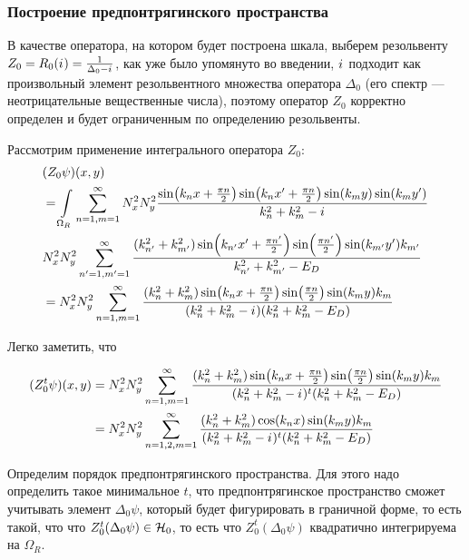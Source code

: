 \subsubsection{Построение предпонтрягинского пространства}
В качестве оператора, на котором будет построена шкала, выберем резольвенту $Z_0 = R_0({i\mkern1mu}) = \frac{1}{\Delta_0 - {i\mkern1mu}}$, как уже было упомянуто во введении, ${i\mkern1mu}$ подходит как произвольный элемент резольвентного множества оператора $\Delta_0$ (его спектр — неотрицательные вещественные числа), поэтому оператор $Z_0$ корректно определен и будет ограниченным по определению резольвенты.

Рассмотрим применение интегрального оператора $Z_0$:
\begin{align*}
& (Z_0 \psi)(x, y) \\
&= \int\limits_{\Omega_R} \sum\limits_{n = 1, m = 1}^\infty N_x^2 N_y^2 \frac{\sin(k_n x + \frac{\pi n}{2}) \sin(k_n x' + \frac{\pi n}{2}) \sin(k_m y) \sin(k_m y')}{k^2_n + k^2_m - {i\mkern1mu}} \\
& N_x^2 N_y^2 \sum\limits_{n' = 1, m' = 1}^\infty \frac{(k_{n'}^2 + k_{m'}^2) \sin(k_{n'} x' + \frac{\pi n'}{2}) \sin(\frac{\pi n'}{2}) \sin(k_{m'} y') k_{m'}}{k_{n'}^2 + k_{m'}^2 - E_D} \\
&= N_x^2 N_y^2 \sum\limits_{n = 1, m = 1}^\infty \frac{(k_n^2 + k_m^2) \sin(k_n x + \frac{\pi n}{2}) \sin(\frac{\pi n}{2}) \sin(k_m y) k_m}{(k_n^2 + k_m^2 - {i\mkern1mu}) (k_n^2 + k_m^2 - E_D)}
\end{align*}

Легко заметить, что 

\begin{align*}
(Z_0^t \psi)(x, y)
&= N_x^2 N_y^2 \sum\limits_{n = 1, m = 1}^\infty \frac{(k_n^2 + k_m^2) \sin(k_n x + \frac{\pi n}{2}) \sin(\frac{\pi n}{2}) \sin(k_m y) k_m}{(k_n^2 + k_m^2 - {i\mkern1mu})^t (k_n^2 + k_m^2 - E_D)} \\
&= N_x^2 N_y^2 \sum\limits_{n = 1,2, m = 1}^\infty \frac{(k_n^2 + k_m^2) \cos(k_n x) \sin(k_m y) k_m}{(k_n^2 + k_m^2 - {i\mkern1mu})^t (k_n^2 + k_m^2 - E_D)}
\end{align*}


Определим порядок предпонтрягинского пространства. Для этого надо определить такое минимальное $t$, что предпонтрягинское пространство сможет учитывать элемент $\Delta_0 \psi$, который будет фигурировать в граничной форме, то есть такой, что что $Z_0^t (\Delta_0 \psi) \in \mathcal{H}_{0}$, то есть что $Z_0^t (\Delta_0 \psi)$ квадратично интегрируема на $\Omega_R$.

